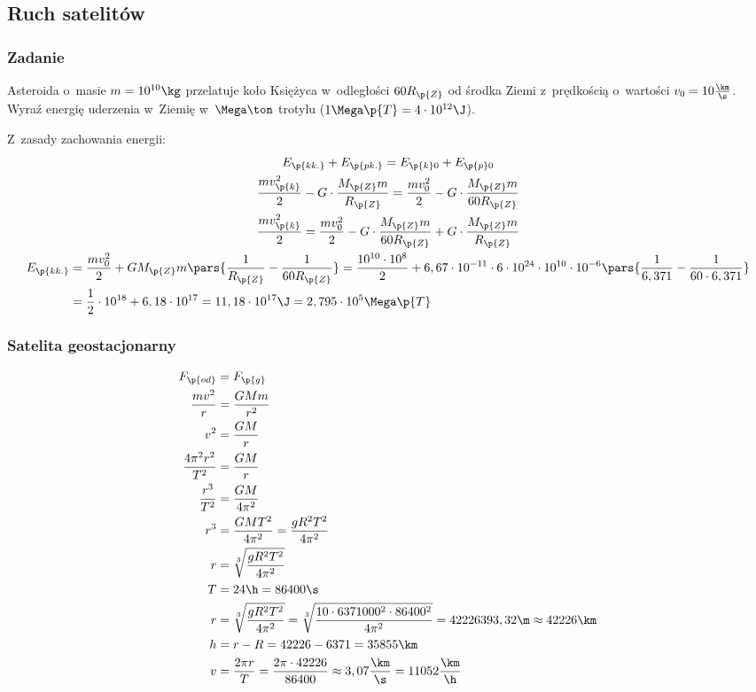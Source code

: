\subsection*{Ruch satelitów}
\subsubsection*{Zadanie}
\begin{statement}
    Asteroida o~masie \(m = 10^{10}\kg\) przelatuje koło Księżyca w~odległości \(60R_\p{Z}\) od środka Ziemi z~prędkością o~wartości \(v_0 = 10\frac{\km}{\s}\). Wyraź energię uderzenia w~Ziemię w~\(\Mega\ton\) trotylu (\(1\Mega\p{T} = 4 \cdot 10^{12}\J\)).
\end{statement}
Z~zasady zachowania energii:
\begin{gather*}
    E_\p{k k.} + E_\p{p k.} = E_{\p{k} 0} + E_{\p{p} 0}\\
    \frac{mv_\p{k}^2}{2} - G \cdot \frac{M_\p{Z}m}{R_\p{Z}} = \frac{mv_0^2}{2} - G \cdot \frac{M_\p{Z}m}{60R_\p{Z}}\\
    \frac{mv_\p{k}^2}{2} = \frac{mv_0^2}{2} - G \cdot \frac{M_\p{Z}m}{60R_\p{Z}} + G \cdot \frac{M_\p{Z}m}{R_\p{Z}}\\
    \begin{split}
        E_\p{k k.}
            &= \frac{mv_0^2}{2} + GM_\p{Z}m\pars{\frac{1}{R_\p{Z}} - \frac{1}{60R_\p{Z}}}
            = \frac{10^{10} \cdot 10^8}{2} + 6,67 \cdot 10^{-11} \cdot 6 \cdot 10^{24} \cdot 10^{10} \cdot 10^{-6}\pars{\frac{1}{6,371} - \frac{1}{60 \cdot 6,371}}\\
            &= \frac{1}{2} \cdot 10^{18} + 6,18 \cdot 10^{17}
            = 11,18 \cdot 10^{17}\J = 2,795 \cdot 10^{5}\Mega\p{T}
    \end{split}
\end{gather*}
\subsubsection*{Satelita geostacjonarny}
\begin{align*}
    F_\p{od} &= F_\p{g}\\
    \frac{mv^2}{r} &= \frac{GMm}{r^2}\\
    v^2 &= \frac{GM}{r}\\
    \frac{4\pi^2r^2}{T^2} &= \frac{GM}{r}\\
    \frac{r^3}{T^2} &= \frac{GM}{4\pi^2}\\
    r^3 &= \frac{GMT^2}{4\pi^2} = \frac{gR^2T^2}{4\pi^2}\\
    r &= \sqrt[3]{\frac{gR^2T^2}{4\pi^2}}\\
    T &= 24\h = 86400\s\\
    r &= \sqrt[3]{\frac{gR^2T^2}{4\pi^2}} = \sqrt[3]{\frac{10 \cdot 6371000^2 \cdot 86400^2}{4\pi^2}} = 42226393,32\m \approx 42226\km\\
    h &= r - R = 42226 - 6371 = 35855\km\\
    v &= \frac{2\pi r}{T} = \frac{2\pi \cdot 42226}{86400} \approx 3,07\frac{\km}{\s} = 11052\frac{\km}{\h}
\end{align*}
